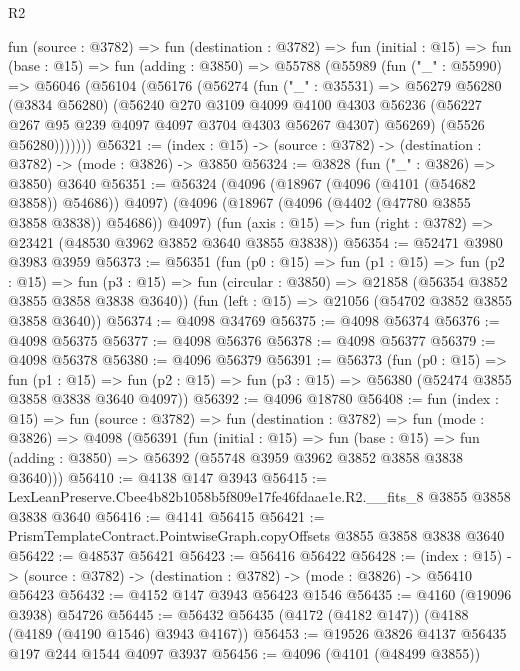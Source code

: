 \begin{lexlean}{R2}
\begin{coremodule}
  fun (source : @3782) =>
  fun (destination : @3782) =>
  fun (initial : @15) =>
  fun (base : @15) =>
  fun (adding : @3850) =>
  @55788
    (@55989
      (fun ("_" : @55990) =>
      @56046
        (@56104
          (@56176
            (@56274
              (fun ("_" : @35531) =>
              @56279
                @56280
                (@3834 @56280)
                (@56240
                  @270
                  @3109
                  @4099
                  @4100
                  @4303
                  @56236
                  (@56227 @267 @95 @239 @4097 @4097 @3704 @4303 @56267 @4307)
                  @56269)
                (@5526 @56280)))))))
@56321 := (index : @15) -> (source : @3782) -> (destination : @3782) -> (mode : @3826) -> @3850
@56324 := @3828 (fun ("_" : @3826) => @3850) @3640
@56351 := @56324
    (@4096 (@18967 (@4096 (@4101 (@54682 @3858)) @54686)) @4097)
    (@4096 (@18967 (@4096 (@4402 (@47780 @3855 @3858 @3838)) @54686)) @4097)
    (fun (axis : @15) => fun (right : @3782) => @23421 (@48530 @3962 @3852 @3640 @3855 @3838))
@56354 := @52471 @3980 @3983 @3959
@56373 := @56351
    (fun (p0 : @15) =>
    fun (p1 : @15) =>
    fun (p2 : @15) =>
    fun (p3 : @15) => fun (circular : @3850) => @21858 (@56354 @3852 @3855 @3858 @3838 @3640))
    (fun (left : @15) => @21056 (@54702 @3852 @3855 @3858 @3640))
@56374 := @4098 @34769
@56375 := @4098 @56374
@56376 := @4098 @56375
@56377 := @4098 @56376
@56378 := @4098 @56377
@56379 := @4098 @56378
@56380 := @4096 @56379
@56391 := @56373
    (fun (p0 : @15) =>
    fun (p1 : @15) =>
    fun (p2 : @15) => fun (p3 : @15) => @56380 (@52474 @3855 @3858 @3838 @3640 @4097))
@56392 := @4096 @18780
@56408 := fun (index : @15) =>
  fun (source : @3782) =>
  fun (destination : @3782) =>
  fun (mode : @3826) =>
  @4098
    (@56391
      (fun (initial : @15) =>
      fun (base : @15) =>
      fun (adding : @3850) => @56392 (@55748 @3959 @3962 @3852 @3858 @3838 @3640)))
@56410 := @4138 @147 @3943
@56415 := LexLeanPreserve.Cbee4b82b1058b5f809e17fe46fdaae1e.R2.__fits_8 @3855 @3858 @3838 @3640
@56416 := @4141 @56415
@56421 := PrismTemplateContract.PointwiseGraph.copyOffsets @3855 @3858 @3838 @3640
@56422 := @48537 @56421
@56423 := @56416 @56422
@56428 := (index : @15) ->
  (source : @3782) -> (destination : @3782) -> (mode : @3826) -> @56410 @56423
@56432 := @4152 @147 @3943 @56423 @1546
@56435 := @4160 (@19096 @3938) @54726
@56445 := @56432 @56435 (@4172 (@4182 @147)) (@4188 (@4189 (@4190 @1546) @3943 @4167))
@56453 := @19526 @3826 @4137 @56435 @197 @244 @1544 @4097 @3937
@56456 := @4096 (@4101 (@48499 @3855))

\end{coremodule}
\end{lexlean}
